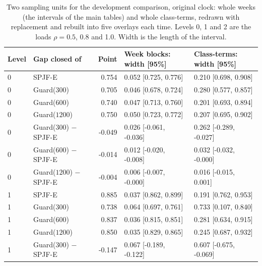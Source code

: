 \documentclass[mathematics,supfile,submit,moreauthors]{Definitions/mdpi}
\newcommand{\devnum}[1]{#1}
\begin{document}
\begin{table}[htbp]
\centering
\small
\caption{Two sampling units for the development comparison, original clock: whole weeks (the intervals of the main tables) and whole class-terms, redrawn with replacement and rebuilt into five overlays each time. Levels \devnum{0}, \devnum{1} and \devnum{2} are the loads $\rho = \devnum{0.5}$, \devnum{0.8} and \devnum{1.0}. Width is the length of the interval.}
\label{tab:s_cluster}
\setlength{\tabcolsep}{3pt}
\begin{tabular}{llrll}
\toprule
Level & Gap closed of & Point & Week blocks: width [95\%] & Class-terms: width [95\%] \\
\midrule
\devnum{0} & SPJF-E                         & \devnum{0.754} & \devnum{0.052 [0.725, 0.776]} & \devnum{0.210 [0.698, 0.908]} \\
\devnum{0} & Guard($\devnum{300}$)          & \devnum{0.705} & \devnum{0.046 [0.678, 0.724]} & \devnum{0.280 [0.577, 0.857]} \\
\devnum{0} & Guard($\devnum{600}$)          & \devnum{0.740} & \devnum{0.047 [0.713, 0.760]} & \devnum{0.201 [0.693, 0.894]} \\
\devnum{0} & Guard($\devnum{1200}$)         & \devnum{0.750} & \devnum{0.050 [0.723, 0.772]} & \devnum{0.207 [0.695, 0.902]} \\
\devnum{0} & Guard($\devnum{300}$) $-$ SPJF-E & \devnum{-0.049} & \devnum{0.026 [-0.061, -0.036]} & \devnum{0.262 [-0.289, -0.027]} \\
\devnum{0} & Guard($\devnum{600}$) $-$ SPJF-E & \devnum{-0.014} & \devnum{0.012 [-0.020, -0.008]} & \devnum{0.032 [-0.032, -0.000]} \\
\devnum{0} & Guard($\devnum{1200}$) $-$ SPJF-E & \devnum{-0.004} & \devnum{0.006 [-0.007, -0.000]} & \devnum{0.016 [-0.015, 0.001]} \\
\midrule
\devnum{1} & SPJF-E                         & \devnum{0.885} & \devnum{0.037 [0.862, 0.899]} & \devnum{0.191 [0.762, 0.953]} \\
\devnum{1} & Guard($\devnum{300}$)          & \devnum{0.738} & \devnum{0.064 [0.697, 0.761]} & \devnum{0.733 [0.107, 0.840]} \\
\devnum{1} & Guard($\devnum{600}$)          & \devnum{0.837} & \devnum{0.036 [0.815, 0.851]} & \devnum{0.281 [0.634, 0.915]} \\
\devnum{1} & Guard($\devnum{1200}$)         & \devnum{0.850} & \devnum{0.035 [0.829, 0.865]} & \devnum{0.245 [0.687, 0.932]} \\
\devnum{1} & Guard($\devnum{300}$) $-$ SPJF-E & \devnum{-0.147} & \devnum{0.067 [-0.189, -0.122]} & \devnum{0.607 [-0.675, -0.069]} \\

\end{tabular}
\end{table}
\end{document}
